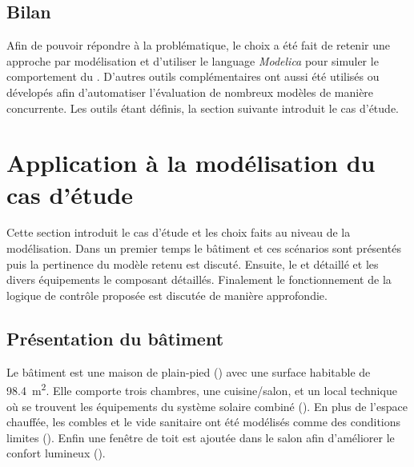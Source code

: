 \subsection{Bilan} %
\label{sub:bilan}
Afin de pouvoir répondre à la problématique, le choix a été fait de retenir une approche
par modélisation et d’utiliser le language \textit{Modelica} pour simuler le comportement
du . D’autres outils complémentaires ont aussi été utilisés ou dévelopés afin
d’automatiser l’évaluation de nombreux modèles de manière concurrente. Les outils étant
définis, la section suivante introduit le cas d’étude.



\section{Application à la modélisation du cas d’étude} %
\label{sec:application_a_la_modelisation_du_cas_d_etude}
Cette section introduit le cas d’étude et les choix faits au niveau de la modélisation.
Dans un premier temps le bâtiment et ces scénarios sont présentés puis la pertinence
du modèle retenu est discuté. Ensuite, le  et détaillé et les divers équipements
le composant détaillés. Finalement le fonctionnement de la logique de contrôle proposée
est discutée de manière approfondie.


\subsection{Présentation du bâtiment} %
\label{sub:présentation_du_bâtiment}
Le bâtiment est une maison de plain-pied () avec une surface habitable
de \SI{98.4}{\meter\squared}. Elle comporte trois chambres, une cuisine/salon, et un local
technique où se trouvent les équipements du système solaire combiné (). En plus de
l’espace chauffée, les combles et le vide sanitaire ont été modélisés comme des conditions
limites (). Enfin une fenêtre de toit est ajoutée dans
le salon afin d’améliorer le confort lumineux ().

